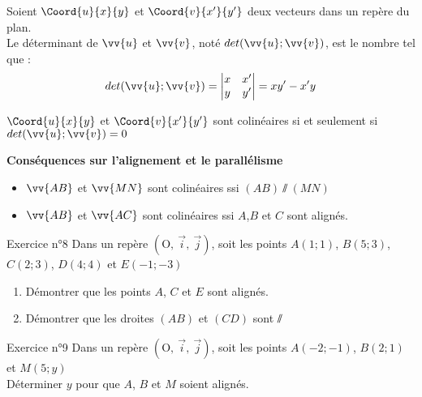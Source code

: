 \documentclass[12pt,a4paper]{article}
\def\Oij{$\left(\text{O},~\vec{i},~\vec{j}\right)$}
\begin{document}
\begin{defi}
Soient $\Coord{u}{x}{y}$ et $\Coord{v}{x'}{y'}$ deux vecteurs dans un repère du plan.\\
Le déterminant de $\vv{u}$ et $\vv{v}$, noté $det(\vv{u};\vv{v})$, est le nombre tel que : $$det(\vv{u};\vv{v})=\begin{vmatrix} x & x' \\ y & y' \end{vmatrix}=xy'-x'y$$

\end{defi}


\begin{pro}
$\Coord{u}{x}{y}$ et $\Coord{v}{x'}{y'}$ sont colinéaires si et seulement si $det(\vv{u};\vv{v})=0$
\end{pro}

\begin{pro}
\textbf{Conséquences sur l'alignement et le parallélisme}

\begin{itemize}
    \item $\vv{AB}$ et $\vv{MN}$ sont colinéaires ssi $(AB)\sslash (MN)$
    \item $\vv{AB}$ et $\vv{AC}$ sont colinéaires ssi $A$,$B$ et $C$ sont alignés.
\end{itemize}
\end{pro}

\begin{mybox}{Exercice n°8}
Dans un repère \Oij{}, soit les points $A(1;1)$, $B(5; 3)$, $C(2;3)$, $D(4;4)$ et $E(-1;-3)$\\

\begin{enumerate}
    \item Démontrer que les points $A$, $C$ et $E$ sont alignés.
    \item Démontrer que les droites $(AB)$ et $(CD)$ sont $\sslash$
\end{enumerate}


\end{mybox}

\begin{framed}
\vspace{6cm}
\end{framed}


\begin{mybox}{Exercice n°9}
Dans un repère \Oij{}, soit les points $A(-2;-1)$, $B(2; 1)$ et $M(5;y)$\\

Déterminer $y$ pour que $A$, $B$ et $M$ soient alignés.

\end{mybox}
\end{document}
